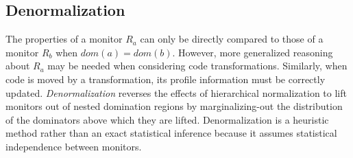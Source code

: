 





\subsection{Denormalization}
\label{cp:denorm}

The properties of a monitor $R_a$ can only be directly compared to
those of a monitor $R_b$ when $dom(a) = dom(b)$.  However, more
generalized reasoning about $R_a$ may be needed when considering code
transformations.  Similarly, when code is moved by a transformation,
its profile information must be correctly updated. {\it
  Denormalization} reverses the effects of hierarchical normalization
to lift monitors out of nested domination regions by marginalizing-out
the distribution of the dominators above which they are lifted.
Denormalization is a heuristic method rather than an exact statistical
inference because it assumes statistical independence between monitors.

  
